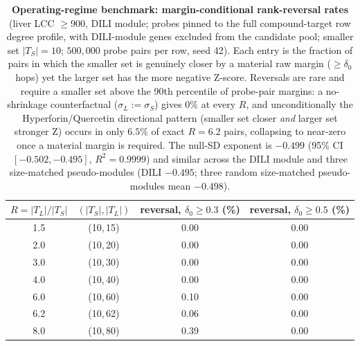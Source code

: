 \begin{table}[ht]
\centering
\caption{\textbf{Operating-regime benchmark: margin-conditional rank-reversal rates} (liver LCC $\geq$900, DILI module; probes pinned to the full compound-target row degree profile, with DILI-module genes excluded from the candidate pool; smaller set $|T_S|=10$; $500{,}000$ probe pairs per row, seed 42). Each entry is the fraction of pairs in which the smaller set is genuinely closer by a material raw margin ($\geq\delta_0$ hops) yet the larger set has the more negative Z-score. Reversals are rare and require a smaller set above the 90th percentile of probe-pair margins: a no-shrinkage counterfactual ($\sigma_L:=\sigma_S$) gives $0\%$ at every $R$, and unconditionally the Hyperforin/Quercetin directional pattern (smaller set closer \emph{and} larger set stronger Z) occurs in only $6.5\%$ of exact $R=6.2$ pairs, collapsing to near-zero once a material margin is required. The null-SD exponent is $-0.499$ (95\% CI $[-0.502,-0.495]$, $R^2=0.9999$) and similar across the DILI module and three size-matched pseudo-modules (DILI $-0.495$; three random size-matched pseudo-modules mean $-0.498$).}
\label{tab:s_opregime}
\begin{tabular}{@{}cc S[table-format=1.2] S[table-format=1.2]@{}}
\toprule
$R=|T_L|/|T_S|$ & $(|T_S|,|T_L|)$ & {reversal, $\delta_0\geq0.3$ (\%)} & {reversal, $\delta_0\geq0.5$ (\%)} \\
 & (10,\,15) & 0.00 & 0.00 \\
2.0 & (10,\,20) & 0.00 & 0.00 \\
3.0 & (10,\,30) & 0.00 & 0.00 \\
4.0 & (10,\,40) & 0.00 & 0.00 \\
6.0 & (10,\,60) & 0.10 & 0.00 \\
6.2 & (10,\,62) & 0.06 & 0.00 \\
8.0 & (10,\,80) & 0.39 & 0.00 \\
\bottomrule
\end{tabular}
\end{table}

